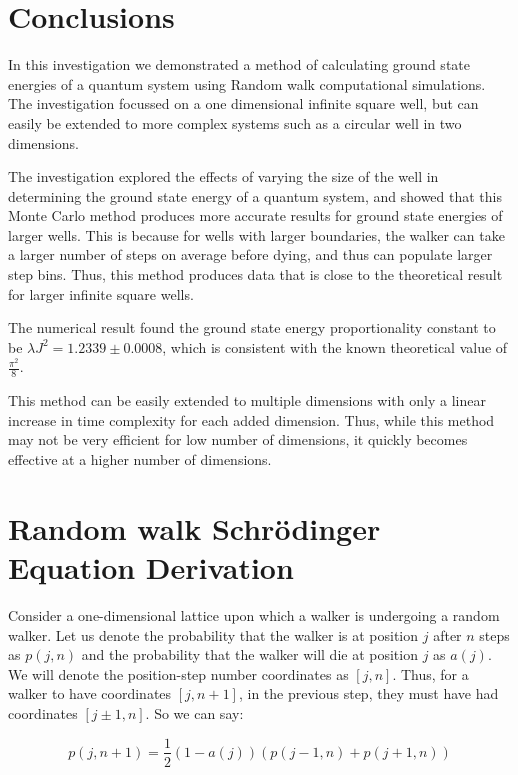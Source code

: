 \documentclass[journal]{IEEEtran}
\begin{document}
\section{Conclusions}

In this investigation we demonstrated a method of calculating ground state
energies of a quantum system using Random walk computational simulations. The
investigation focussed on a one dimensional infinite square well, but can easily
be extended to more complex systems such as a circular well in two dimensions.

The investigation explored the effects of varying the size of the well in
determining the ground state energy of a quantum system, and showed that this
Monte Carlo method produces more accurate results for ground state energies of
larger wells.  This is because for wells with larger boundaries, the walker can
take a larger number of steps on average before dying, and thus can populate
larger step bins. Thus, this method produces data that is close to the
theoretical result for larger infinite square wells.

The numerical result found the ground state energy proportionality constant to
be $\lambda J^2 = 1.2339 \pm 0.0008$, which is consistent with the known
theoretical value of $\frac{\pi^2}{8}$.

This method can be easily extended to multiple dimensions with only a linear
increase in time complexity for each added dimension. Thus, while this method
may not be very efficient for low number of dimensions, it quickly becomes
effective at a higher number of dimensions.


\pagebreak
\appendices
\section{Random walk Schr\"{o}dinger Equation Derivation}
\label{appendix:derivation}
Consider a one-dimensional lattice upon which a walker is undergoing a random
walker. Let us denote the probability that the walker is at position $j$ after
$n$ steps as $p(j,n)$ and the probability that the walker will die at position
$j$ as $a(j)$. We will denote the position-step number coordinates as $[j,
n]$. Thus, for a walker to have coordinates $[j, n+1]$, in the previous step,
they must have had coordinates $[j \pm 1, n]$. So we can say:

\begin{equation}
  \label{eq:probability}
  p(j, n+1) =  \frac{1}{2}(1-a(j))(p(j-1,n) + p(j+1,n))
\end{equation}
\end{document}
